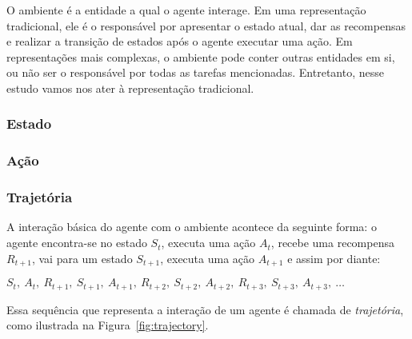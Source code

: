 \documentclass{article}
\begin{document}
                O ambiente é a entidade a qual o agente interage. Em uma representação tradicional, ele é o responsável por apresentar o estado atual, dar as recompensas e realizar a transição de estados após o agente executar uma ação. Em representações mais complexas, o ambiente pode conter outras entidades em si, ou não ser o responsável por todas as tarefas mencionadas. Entretanto, nesse estudo vamos nos ater à representação tradicional.
            
            \subsubsection{Estado}
            \subsubsection{Ação} 
            
            \subsubsection{Trajetória}
            
                A interação básica do agente com o ambiente acontece da seguinte forma: o agente encontra-se no estado $S_t$, executa uma ação $A_t$, recebe uma recompensa $R_{t+1}$, vai para um estado $S_{t+1}$, executa uma ação $A_{t+1}$ e assim por diante:

                $S_t,\ A_t,\ R_{t+1},\ S_{t+1},\ A_{t+1},\ R_{t+2},\ S_{t+2},\ A_{t+2},\ R_{t+3},\ S_{t+3},\ A_{t+3},\ \dots$
                
                Essa sequência que representa a interação de um agente é chamada de \emph{trajetória}, como ilustrada na Figura~\ref{fig:trajectory}.
\end{document}
